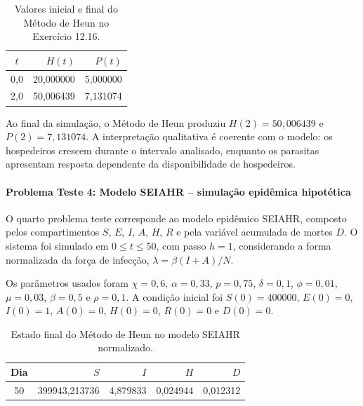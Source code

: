 \begin{table}[H]
    \centering
    \caption{Valores inicial e final do Método de Heun no Exercício 12.16.}
    \begin{tabular}{c|r|r}
        \textbf{\(t\)} & \textbf{\(H(t)\)} & \textbf{\(P(t)\)} \\
        \hline
        0{,}0 & 20{,}000000 & 5{,}000000 \\
        2{,}0 & 50{,}006439 & 7{,}131074 \\
    \end{tabular}
\end{table}

Ao final da simulação, o Método de Heun produziu \(H(2)=50{,}006439\) e \(P(2)=7{,}131074\). A interpretação qualitativa é coerente com o modelo: os hospedeiros crescem durante o intervalo analisado, enquanto os parasitas apresentam resposta dependente da disponibilidade de hospedeiros.

\paragraph{Problema Teste 4: Modelo SEIAHR -- simulação epidêmica hipotética}

O quarto problema teste corresponde ao modelo epidêmico SEIAHR, composto pelos compartimentos \(S\), \(E\), \(I\), \(A\), \(H\), \(R\) e pela variável acumulada de mortes \(D\). O sistema foi simulado em \(0\leq t\leq 50\), com passo \(h=1\), considerando a forma normalizada da força de infecção, \(\lambda=\beta(I+A)/N\).

Os parâmetros usados foram \(\chi=0{,}6\), \(\alpha=0{,}33\), \(p=0{,}75\), \(\delta=0{,}1\), \(\phi=0{,}01\), \(\mu=0{,}03\), \(\beta=0{,}5\) e \(\rho=0{,}1\). A condição inicial foi \(S(0)=400000\), \(E(0)=0\), \(I(0)=1\), \(A(0)=0\), \(H(0)=0\), \(R(0)=0\) e \(D(0)=0\).

\begin{table}[H]
    \centering
    \caption{Estado final do Método de Heun no modelo SEIAHR normalizado.}
    \begin{tabular}{c|r|r|r|r}
        \textbf{Dia} & \textbf{\(S\)} & \textbf{\(I\)} & \textbf{\(H\)} & \textbf{\(D\)} \\
        \hline
        50 & 399943{,}213736 & 4{,}879833 & 0{,}024944 & 0{,}012312 \\
    \end{tabular}
\end{table}

